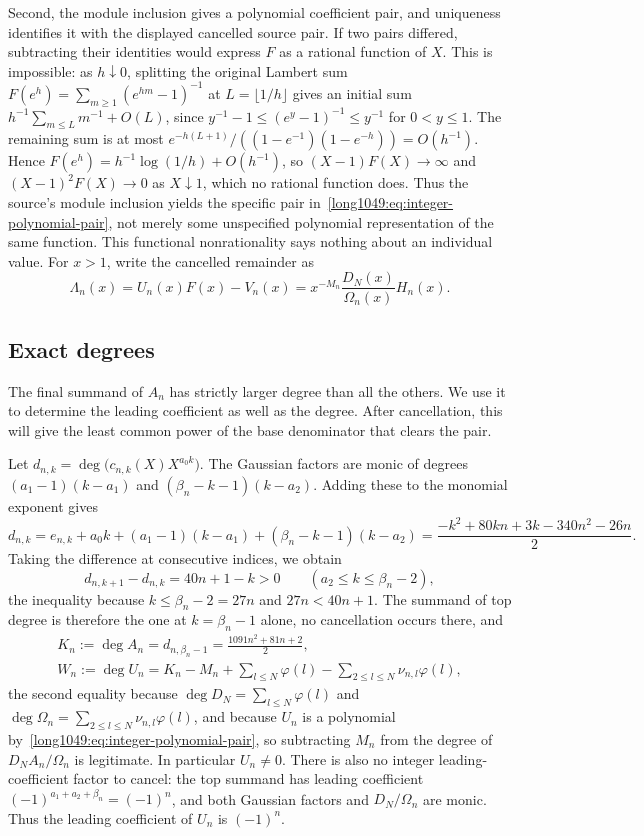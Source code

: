 Second, the module inclusion gives a polynomial coefficient pair,
and uniqueness identifies it with the displayed cancelled source pair.
If two pairs differed, subtracting their identities would express $F$
as a rational function of $X$. This is impossible: as $h\downarrow0$,
splitting the original Lambert sum $F(e^h)=\sum_{m\ge1}(e^{hm}-1)^{-1}$
at $L=\lfloor1/h\rfloor$ gives an initial sum
$h^{-1}\sum_{m\le L}m^{-1}+O(L)$, since
$y^{-1}-1\le(e^y-1)^{-1}\le y^{-1}$ for $0<y\le1$.
The remaining sum is at most
$e^{-h(L+1)}/((1-e^{-1})(1-e^{-h}))=O(h^{-1})$.  Hence
$F(e^h)=h^{-1}\log(1/h)+O(h^{-1})$, so
$(X-1)F(X)\to\infty$ and $(X-1)^{2}F(X)\to0$ as $X\downarrow1$, which no
rational function does. Thus the source's module inclusion yields the
specific pair in~\eqref{long1049:eq:integer-polynomial-pair}, not merely
some unspecified polynomial representation of the same function.
This functional nonrationality says nothing about an individual value.
For $x>1$, write the cancelled remainder as
\[
 \Lambda_n(x)=U_n(x)F(x)-V_n(x)
 =x^{-M_n}\frac{D_N(x)}{\Omega_n(x)}H_n(x).
\]

\subsection{Exact degrees}\label{long1049:sec:degrees}

The final summand of $A_n$ has strictly larger degree than all the
others. We use it to determine the leading coefficient as well as the
degree. After cancellation, this will give the least common power
of the base denominator that clears the pair.

Let $d_{n,k}=\deg\bigl(c_{n,k}(X)X^{a_0k}\bigr)$. The Gaussian factors
are monic of degrees $(a_1-1)(k-a_1)$ and
$(\beta_n-k-1)(k-a_2)$. Adding these to the monomial exponent gives
\[
 d_{n,k}=e_{n,k}+a_0k+(a_1-1)(k-a_1)+(\beta_n-k-1)(k-a_2)
 =\frac{-k^{2}+80kn+3k-340n^{2}-26n}{2}.
\]
Taking the difference at consecutive indices, we obtain
\[
 d_{n,k+1}-d_{n,k}=40n+1-k>0\qquad(a_2\le k\le\beta_n-2),
\]
the inequality because $k\le\beta_n-2=27n$ and $27n<40n+1$.  The summand of
top degree is therefore the one at $k=\beta_n-1$ alone, no cancellation occurs
there, and
\begin{equation}\label{long1049:eq:exact-degree}
 \begin{gathered}
 K_n:=\deg A_n=d_{n,\beta_n-1}=\frac{1091n^{2}+81n+2}{2},
 \\
 W_n:=\deg U_n=K_n-M_n+\sum_{l\le N}\varphi(l)-\sum_{2\le l\le N}\nu_{n,l}\varphi(l),
\end{gathered}
\end{equation}
the second equality because $\deg D_N=\sum_{l\le N}\varphi(l)$ and
$\deg\Omega_n=\sum_{2\le l\le N}\nu_{n,l}\varphi(l)$, and because
$U_n$ is a polynomial by~\eqref{long1049:eq:integer-polynomial-pair}, so subtracting
$M_n$ from the degree of $D_NA_n/\Omega_n$ is legitimate.  In particular
$U_n\ne0$. There is also no integer leading-coefficient factor to
cancel: the top summand has leading coefficient
$(-1)^{a_1+a_2+\beta_n}=(-1)^n$, and both Gaussian factors and
$D_N/\Omega_n$ are monic. Thus the leading coefficient of $U_n$ is
$(-1)^n$.

